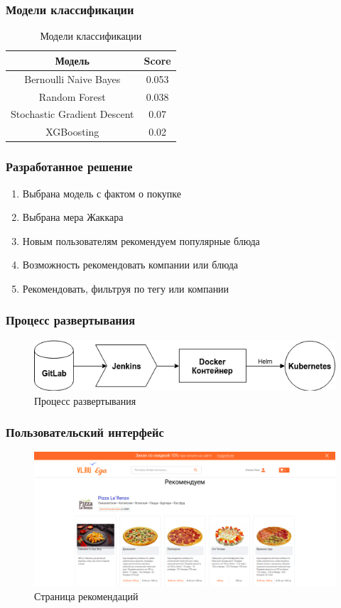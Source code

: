 \documentclass[10pt, unicode]{beamer}
\begin{document}
\begin{frame}
  \frametitle{Модели классификации}
  \begin{table}[H]
    \centering
    \begin{tabular} { | c | c | }
      \hline
      Модель & Score \\
      \hline
      Bernoulli Naive Bayes & 0.053 \\
      Random Forest & 0.038 \\
      Stochastic Gradient Descent & 0.07 \\
      XGBoosting & 0.02 \\
      \hline
    \end{tabular}
    \caption{Модели классификации}
  \end{table}
\end{frame}

\begin{frame}
  \frametitle{Разработанное решение}
  \begin{enumerate}
    \item Выбрана модель с фактом о покупке
    \item Выбрана мера Жаккара
    \item Новым пользователям рекомендуем популярные блюда
    \item Возможность рекомендовать компании или блюда
    \item Рекомендовать, фильтруя по тегу или компании
  \end{enumerate}
\end{frame}

\begin{frame}
  \frametitle{Процесс развертывания}
  \begin{figure}[H]
    \centering
    \includegraphics[scale=0.5]{images/deploy.png}
    \caption{Процесс развертывания}
  \end{figure}
\end{frame}

\begin{frame}
  \frametitle{Пользовательский интерфейс}
  \begin{figure}[H]
    \centering
    \includegraphics[scale=0.23]{images/tag_page.png}
    \caption{Страница рекомендаций}
  \end{figure}
\end{frame}
\end{document}
